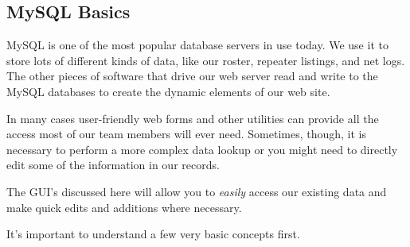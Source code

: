 \documentclass[pdflatex,letterpaper,twoside,12pt]{book}
\begin{document}
\subsection{MySQL Basics}

MySQL is one of the most popular database servers in use today.  We use it to store lots of different kinds of data, like our roster, repeater listings, and net logs.  The other pieces of software that drive our web server read and write to the MySQL databases to create the dynamic elements of our web site.

In many cases user-friendly web forms and other utilities can provide all the access most of our team members will ever need.  Sometimes, though, it is necessary to perform a more complex data lookup or you might need to directly edit some of the information in our records.

The GUI's discussed here will allow you to \emph{easily} access our existing data and make quick edits and additions where necessary.

It's important to understand a few very basic concepts first.
\end{document}
